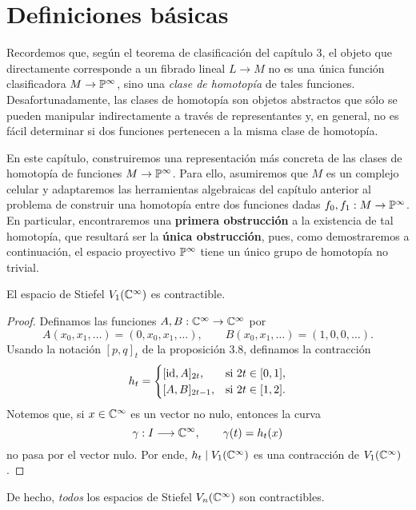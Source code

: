 \section{Definiciones básicas}

Recordemos que, según el teorema de clasificación del capítulo 3, el objeto que directamente corresponde a un fibrado lineal $L \to M$ no es una única función clasificadora $M \to \P^\infty$, sino una \textit{clase de homotopía} de tales funciones. Desafortunadamente, las clases de homotopía son objetos abstractos que sólo se pueden manipular indirectamente a través de representantes y, en general, no es fácil determinar si dos funciones pertenecen a la misma clase de homotopía.

En este capítulo, construiremos una representación más concreta de las clases de homotopía de funciones $M \to \P^\infty$. Para ello, asumiremos que $M$ es un complejo celular y adaptaremos las herramientas algebraicas del capítulo anterior al problema de construir una homotopía entre dos funciones dadas $f_0, f_1 : M \to \P^\infty$. En particular, encontraremos una \textbf{primera obstrucción} a la existencia de tal homotopía, que resultará ser la \textbf{única obstrucción}, pues, como demostraremos a continuación, el espacio proyectivo $\P^\infty$ tiene un único grupo de homotopía no trivial.

\begin{proposition}
El espacio de Stiefel $V_1(\C^\infty)$ es contractible.
\end{proposition}

\begin{proof}
Definamos las funciones $A, B : \C^\infty \to \C^\infty$ por
$$A(x_0, x_1, \dots) = (0, x_0, x_1, \dots), \qquad B(x_0, x_1, \dots) = (1, 0, 0, \dots).$$
Usando la notación $[p,q]_t$ de la proposición 3.8, definamos la contracción
$$
h_t =
  \begin{cases}
    [\id, A]_{2t}, & \text{si } 2t \in [0,1], \\
    [A, B]_{2t-1}, & \text{si } 2t \in [1,2].
  \end{cases}
$$
Notemos que, si $x \in \C^\infty$ es un vector no nulo, entonces la curva
$$\gamma : I \longrightarrow \C^\infty, \qquad \gamma(t) = h_t(x)$$
no pasa por el vector nulo. Por ende, $h_t \mid V_1(\C^\infty)$ es una contracción de $V_1(\C^\infty)$.
\end{proof}

\begin{remark}
De hecho, \textit{todos} los espacios de Stiefel $V_n(\C^\infty)$ son contractibles.
\end{remark}

